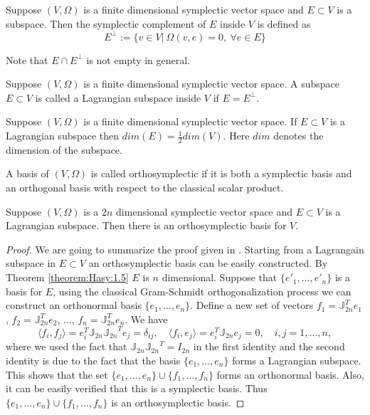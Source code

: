 {\edit 
\begin{definition}  \cite{de2006symplectic}
Suppose $(V,\Omega)$ is a finite dimensional symplectic vector space and $E\subset V$ is a subspace. Then the symplectic complement of $E$ inside $V$ is defined as
\[
	E^{\perp} := \{ v\in V |\ \Omega(v,e) = 0,\ \forall e\in E \}
\]
\end{definition}
Note that $E \cap E^{\perp}$ is not empty in general. 
\begin{definition} \cite{de2006symplectic}
Suppose $(V,\Omega)$ is a finite dimensional symplectic vector space. A subspace $E\subset V$ is called a Lagrangian subspace inside $V$ if $E = E^\perp$.
\end{definition}
\begin{theorem} \label{theorem:Hasy:1.5} \cite{abraham1978foundations}
Suppose $(V,\Omega)$ is a finite dimensional symplectic vector space. If $E\subset V$ is a Lagrangian subspace then $dim(E)=\frac 1 2dim(V)$. Here $dim$ denotes the dimension of the subspace.
\end{theorem}
\begin{definition}
A basis of $(V,\Omega)$ is called orthosymplectic if it is both a symplectic basis and an orthogonal basis with respect to the classical scalar product.
\end{definition}
\begin{theorem} \label{theorem:Hasy:1.6}  \cite{mehl2009perturbation,da2003introduction}
Suppose $(V,\Omega)$ is a $2n$ dimensional symplectic vector space and $E\subset V$ is a Lagrangian subspace. Then there is an orthosymplectic basis for $V$.
\end{theorem}
\begin{proof}
{\blue We are going to summarize the proof given in \cite{mehl2009perturbation}.} Starting from a Lagrangain subspace in $E \subset V$ an orthosymplectic basis can be easily constructed. By Theorem \ref{theorem:Hasy:1.5} $E$ is $n$ dimensional. Suppose that $\{ e'_1,\dots, e'_n \}$ is a basis for $E$, using the classical Gram-Schmidt orthogonalization process we can construct an orthonormal basis $\{ e_1,\dots,e_n \}$. Define a new set of vectors $f_1 = \mathbb J_{2n}^Te_1$, $f_2 =\mathbb J_{2n}^T e_2$, $\dots$, $f_n= \mathbb J_{2n}^Te_n$. We have
\begin{equation}
	\langle f_i, f_j \rangle = e_i^T \mathbb J_{2n} {\mathbb J_{2n}}^T e_j = \delta_{ij}, \quad \langle f_i, e_j \rangle = e_i^T \mathbb J_{2n} e_j = 0, \quad i,j=1,\dots,n,
\end{equation}
where we used the fact that $\mathbb J_{2n} {\mathbb J_{2n}}^T = I_{2n}$ in the first identity and the second identity is due to the fact that the basis $\{ e_1,\dots,e_n \}$ forms a Lagrangian subspace. This shows that the set $\{ e_1,\dots,e_n \}\cup \{ f_1,\dots,f_n \}$ forms an orthonormal basis. Also, it can be easily verified that this is a symplectic basis. Thus $\{ e_1,\dots,e_n \}\cup \{ f_1,\dots,f_n \}$ is an orthosymplectic basis.

\end{proof}}
